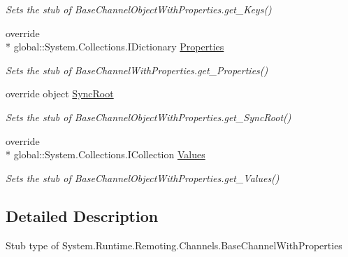 \begin{DoxyCompactItemize}
\begin{DoxyCompactList}\small\item\em Sets the stub of Base\-Channel\-Object\-With\-Properties.\-get\-\_\-\-Keys()\end{DoxyCompactList}\item 
override \\*
global\-::\-System.\-Collections.\-I\-Dictionary \hyperlink{class_system_1_1_runtime_1_1_remoting_1_1_channels_1_1_fakes_1_1_stub_base_channel_with_properties_a2b97ab883a84edae085bec7f3ec70019}{Properties}
\begin{DoxyCompactList}\small\item\em Sets the stub of Base\-Channel\-With\-Properties.\-get\-\_\-\-Properties()\end{DoxyCompactList}\item 
override object \hyperlink{class_system_1_1_runtime_1_1_remoting_1_1_channels_1_1_fakes_1_1_stub_base_channel_with_properties_a3d939635d43b2db57f13002011426add}{Sync\-Root}
\begin{DoxyCompactList}\small\item\em Sets the stub of Base\-Channel\-Object\-With\-Properties.\-get\-\_\-\-Sync\-Root()\end{DoxyCompactList}\item 
override \\*
global\-::\-System.\-Collections.\-I\-Collection \hyperlink{class_system_1_1_runtime_1_1_remoting_1_1_channels_1_1_fakes_1_1_stub_base_channel_with_properties_acde35394731e0c2fc30a0a4f4738621d}{Values}
\begin{DoxyCompactList}\small\item\em Sets the stub of Base\-Channel\-Object\-With\-Properties.\-get\-\_\-\-Values()\end{DoxyCompactList}\end{DoxyCompactItemize}


\subsection{Detailed Description}
Stub type of System.\-Runtime.\-Remoting.\-Channels.\-Base\-Channel\-With\-Properties



